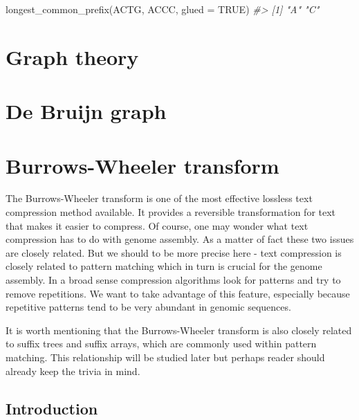 \documentclass[
]{book}
\newenvironment{Shaded}{\begin{snugshade}}{\end{snugshade}}
\newcommand{\AttributeTok}[1]{\textcolor[rgb]{0.77,0.63,0.00}{#1}}
\newcommand{\CommentTok}[1]{\textcolor[rgb]{0.56,0.35,0.01}{\textit{#1}}}
\newcommand{\ConstantTok}[1]{\textcolor[rgb]{0.00,0.00,0.00}{#1}}
\newcommand{\FunctionTok}[1]{\textcolor[rgb]{0.00,0.00,0.00}{#1}}
\newcommand{\NormalTok}[1]{#1}
\newcommand{\StringTok}[1]{\textcolor[rgb]{0.31,0.60,0.02}{#1}}
\begin{document}
\begin{Shaded}
\begin{Highlighting}[]
\FunctionTok{longest\_common\_prefix}\NormalTok{(}\StringTok{\textquotesingle{}ACTG\textquotesingle{}}\NormalTok{, }\StringTok{\textquotesingle{}ACCC\textquotesingle{}}\NormalTok{, }\AttributeTok{glued =} \ConstantTok{TRUE}\NormalTok{)}
\CommentTok{\#\textgreater{} [1] "A" "C"}
\end{Highlighting}
\end{Shaded}

\hypertarget{graph}{%
\chapter{Graph theory}\label{graph}}

\hypertarget{bruijn}{%
\chapter{De Bruijn graph}\label{bruijn}}

\hypertarget{bwt}{%
\chapter{Burrows-Wheeler transform}\label{bwt}}

The Burrows-Wheeler transform is one of the most effective lossless text compression method available. It provides a reversible transformation for text that makes it easier to compress. Of course, one may wonder what text compression has to do with genome assembly. As a matter of fact these two issues are closely related. But we should to be more precise here - text compression is closely related to pattern matching which in turn is crucial for the genome assembly. In a broad sense compression algorithms look for patterns and try to remove repetitions. We want to take advantage of this feature, especially because repetitive patterns tend to be very abundant in genomic sequences.

It is worth mentioning that the Burrows-Wheeler transform is also closely related to suffix trees and suffix arrays, which are commonly used within pattern matching. This relationship will be studied later but perhaps reader should already keep the trivia in mind. \citep{bw1}

\hypertarget{introduction-1}{%
\section{Introduction}\label{introduction-1}}
\end{document}
